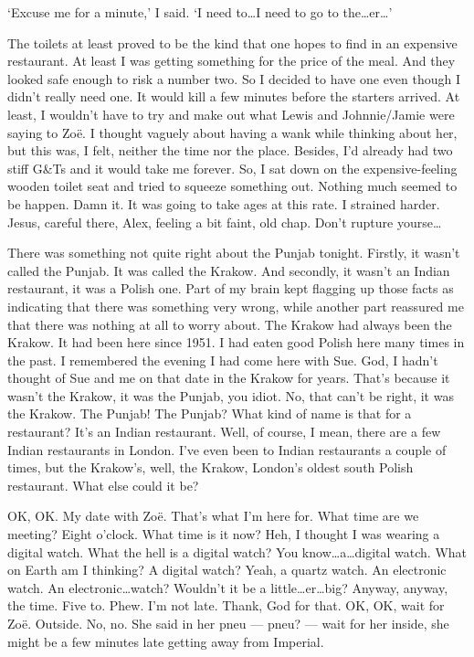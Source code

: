 `Excuse me for a minute,' I said. `I need to\dots I need to go to the\dots er\dots'

The toilets at least proved to be the kind that one hopes to find in
an expensive restaurant. At least I was getting something for the
price of the meal. And they looked safe enough to risk a number two. So I decided to have one even though I didn't really
need one. It would kill a few minutes before the starters arrived.
At least, I wouldn't have to try and make out what Lewis and
Johnnie/Jamie were saying to Zoë. I thought vaguely about having
a wank while thinking about her, but this was, I felt, neither the
time nor the place. Besides, I'd already had two stiff G\&Ts and it
would take me {\twelveit forever}. So, I sat down on the
expensive-feeling wooden toilet seat and tried to squeeze something
out. Nothing much seemed to be happen. Damn it. It was going to take
ages at this rate. I strained harder. Jesus, careful there, Alex,
feeling a bit faint, old chap. Don't rupture yourse\dots

\majorbreak
There was something not quite right about the Punjab tonight.
Firstly, it wasn't called the Punjab. It was called the Krakow. And
secondly, it wasn't an Indian restaurant, it was a Polish one. Part of my brain kept flagging up those facts as indicating that there was
something very wrong, while another part reassured me that there
was nothing at all to worry about. The Krakow had always been the Krakow.
It had been here since 1951. I had eaten good Polish here many times in the past. I remembered the evening I had come here with Sue. God, I
hadn't thought of Sue and me on that date in the Krakow for years.
That's because it wasn't the Krakow, it was the Punjab, you idiot.
No, that can't be right, it was the Krakow. The Punjab! The Punjab?
What kind of name is that for a restaurant? It's an Indian
restaurant. Well, of course, I mean, there are a few Indian
restaurants in London. I've even been to Indian restaurants a couple
of times, but the Krakow's, well, the Krakow, London's oldest south Polish restaurant. What else could it be?

OK, OK. My date with Zoë. That's what I'm here for. What time
are we meeting? Eight o'clock. What time is it now? Heh, I
thought I was wearing a digital watch. What the hell is a {\twelveit
digital\/} watch? You know\dots a\dots digital watch. What on Earth
am I thinking? A digital watch? Yeah, a quartz watch. An electronic
watch. An electronic\dots {\twelveit watch?} Wouldn't it be a
little\dots er\dots big? Anyway, anyway, the time. Five to. Phew.
I'm not late. Thank, God for that. OK, OK, wait for Zoë.
Outside. No, no. She said in her pneu --- {\twelveit pneu?} --- wait
for her inside, she might be a few minutes late getting away from Imperial.

